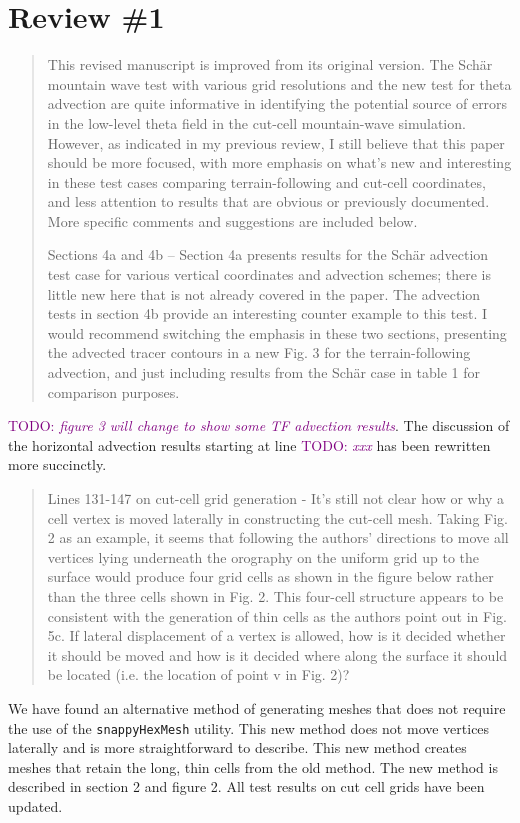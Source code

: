\documentclass{article}
\newcommand{\TODO}[1]{\textcolor{purple}{TODO: \emph{#1}}}
\begin{document}
\section*{Review \#1}
\begin{quotation}
This revised manuscript is improved from its original version. The Sch\"{a}r mountain wave test with various grid resolutions and the new test for theta advection are quite informative in identifying the potential source of errors in the low-level theta field in the cut-cell mountain-wave simulation. However, as indicated in my previous review, I still believe that this paper should be more focused, with more emphasis on what's new and interesting in these test cases comparing terrain-following and cut-cell coordinates, and less attention to results that are obvious or previously documented. More specific comments and suggestions are included below. 

Sections 4a and 4b -- Section 4a presents results for the Sch\"{a}r advection test case for various vertical coordinates and advection schemes; there is little new here that is not already covered in the \citet{schaer2002} paper. The advection tests in section 4b provide an interesting counter example to this test. I would recommend switching the emphasis in these two sections, presenting the advected tracer contours in a new Fig. 3 for the terrain-following advection, and just including results from the Sch\"{a}r case in table 1 for comparison purposes.
\end{quotation}
\TODO{figure 3 will change to show some TF advection results}.  The discussion of the horizontal advection results starting at line \TODO{xxx} has been rewritten more succinctly.

\begin{quotation}
 Lines 131-147 on cut-cell grid generation - It's still not clear how or why a cell vertex  is moved laterally in constructing the cut-cell mesh. Taking Fig. 2 as an example, it  seems that following the authors' directions to move all vertices lying underneath the  orography on the uniform grid up to the surface would produce four grid cells as  shown in the figure below rather than the three cells shown in Fig. 2. This four-cell structure appears to be consistent with the generation of thin cells as the authors  point out in Fig. 5c. If lateral displacement of a vertex is allowed, how is it decided  whether it should be moved and how is it decided where along the surface it should  be located (i.e. the location of point v in Fig. 2)?
\end{quotation}
We have found an alternative method of generating meshes that does not require the use of the \texttt{snappyHexMesh} utility.  This new method does not move vertices laterally and is more straightforward to describe.  This new method creates meshes that retain the long, thin cells from the old method.  The new method is described in section 2 and figure 2.  All test results on cut cell grids have been updated.
\end{document}
